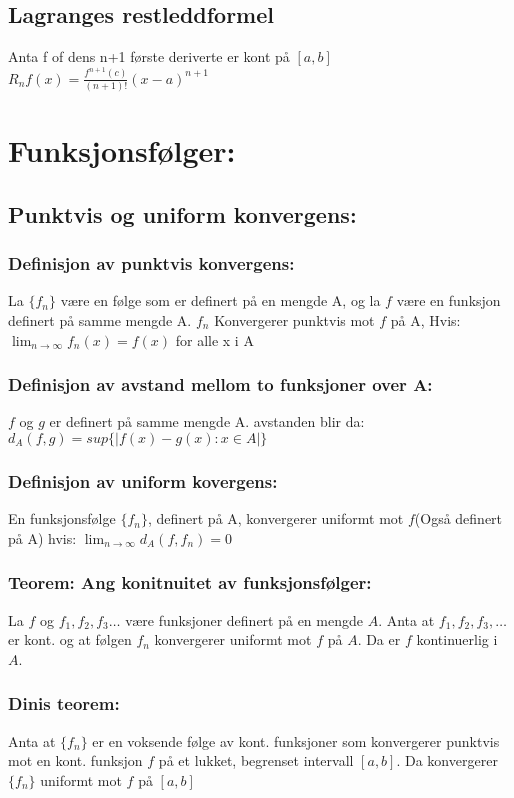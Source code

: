 \documentclass[8pt,a4paper,twocolumn,twoside]{article}
\def\abs#1{\lvert #1 \rvert}
\begin{document}
        \subsection*{Lagranges restleddformel}
        Anta f of dens n+1 første deriverte er kont på $[a,b]$\\
        $R_nf(x) = \frac{f^{n+1}(c)}{(n+1)!}(x-a)^{n+1}$
    \section*{Funksjonsfølger:}
        \subsection*{Punktvis og uniform konvergens:}
            \subsubsection*{Definisjon av punktvis konvergens:}
            La $\{f_n\}$ være en følge som er definert på en mengde A, og la $f$ være en funksjon definert på 
            samme mengde A. ${f_n}$ Konvergerer punktvis mot $f$ på A, Hvis:
            $\lim_{n\to\infty}f_n(x)=f(x)$ for alle x i A
            \subsubsection*{Definisjon av avstand mellom to funksjoner over A:}
            $f$ og $g$ er definert på samme mengde A. avstanden blir da:
            $d_A(f,g) = sup\{\abs{f(x)-g(x):x\in A}\}$
            \subsubsection*{Definisjon av uniform kovergens:}
            En funksjonsfølge $\{f_n\}$, definert på A, konvergerer uniformt mot $f$(Også definert på A) hvis:
            $\lim_{n\to\infty}d_A(f,f_n) = 0$
            \subsubsection*{Teorem: Ang konitnuitet av funksjonsfølger:}
            La $f$ og $f_1,f_2,f_3\dots$ være funksjoner definert på en mengde $A$. Anta at $f_1,f_2, f_3,\dots$ er kont.
            og at følgen ${f_n}$ konvergerer uniformt mot $f$ på $A$. Da er $f$ kontinuerlig i $A$.
            \subsubsection*{Dinis teorem:}
            Anta at $\{f_n\}$ er en voksende følge av kont. funksjoner som konvergerer punktvis mot en kont.
            funksjon $f$ på et lukket, begrenset intervall $[a,b]$. Da konvergerer $\{f_n\}$ uniformt mot $f$ på $[a,b]$
\end{document}
